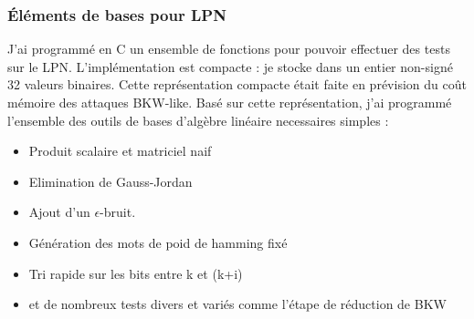 \documentclass{article}		%
\theoremstyle{definition}
\theoremstyle{plain}
\begin{document}
\subsubsection{Éléments de bases pour LPN}
J'ai programmé en C un ensemble de fonctions pour pouvoir effectuer des
tests sur le LPN. L'implémentation est compacte : je stocke dans un
entier non-signé 32 valeurs binaires. Cette représentation compacte était
faite en prévision du coût mémoire des attaques BKW-like. Basé sur cette représentation, j'ai
programmé l'ensemble des outils de bases d'algèbre linéaire necessaires
simples :
\\
\begin{itemize}
\item Produit scalaire et matriciel naif 
\item Elimination de Gauss-Jordan
\item Ajout d'un $\epsilon$-bruit.
\item Génération des mots de poid de hamming fixé
\item Tri rapide sur les bits entre k et (k+i)
\item et de nombreux tests divers et variés comme l'étape de réduction de
BKW
\end{itemize}
\end{document}

